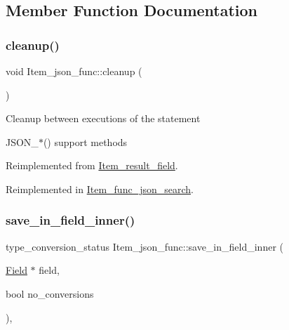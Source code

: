 \subsection{Member Function Documentation}
\mbox{\label{classItem__json__func_a848300ad1b593a1ec577a3e0cafd68dd}} 
\subsubsection{\texorpdfstring{cleanup()}{cleanup()}}
{\footnotesize\ttfamily void Item\+\_\+json\+\_\+func\+::cleanup (\begin{DoxyParamCaption}{ }\end{DoxyParamCaption})\hspace{0.3cm}{\ttfamily [virtual]}}

Cleanup between executions of the statement

J\+S\+O\+N\+\_\+$\ast$() support methods 

Reimplemented from \mbox{\hyperlink{classItem__result__field}{Item\+\_\+result\+\_\+field}}.



Reimplemented in \mbox{\hyperlink{classItem__func__json__search_a2c5ac3f1a34532493a36bdb37241d48d}{Item\+\_\+func\+\_\+json\+\_\+search}}.

\mbox{\label{classItem__json__func_ac8bf3b1104bbbe70d1ec9f4f2bc13fb4}} 
\subsubsection{\texorpdfstring{save\+\_\+in\+\_\+field\+\_\+inner()}{save\_in\_field\_inner()}}
{\footnotesize\ttfamily type\+\_\+conversion\+\_\+status Item\+\_\+json\+\_\+func\+::save\+\_\+in\+\_\+field\+\_\+inner (\begin{DoxyParamCaption}\item[{\mbox{\hyperlink{classField}{Field}} $\ast$}]{field,  }\item[{bool}]{no\+\_\+conversions }\end{DoxyParamCaption})\hspace{0.3cm}{\ttfamily [protected]}, {\ttfamily [virtual]}}

